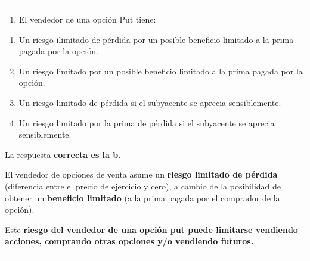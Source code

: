 \documentclass[
  letterpaper,
  DIV=11,
  numbers=noendperiod]{scrreprt}
\providecommand{\tightlist}{%
  \setlength{\itemsep}{0pt}\setlength{\parskip}{0pt}}\usepackage{longtable,booktabs,array}
\begin{document}
\begin{center}\rule{0.5\linewidth}{0.5pt}\end{center}

\begin{enumerate}
\def\labelenumi{\arabic{enumi}.}
\setcounter{enumi}{7}
\tightlist
\item
  El vendedor de una opción Put tiene:
\end{enumerate}

\begin{enumerate}
\def\labelenumi{\alph{enumi})}
\item
  Un riesgo ilimitado de pérdida por un posible beneficio limitado a la
  prima pagada por la opción.
\item
  Un riesgo limitado por un posible beneficio limitado a la prima pagada
  por la opción.
\item
  Un riesgo limitado de pérdida si el subyacente se aprecia
  sensiblemente.
\item
  Un riesgo limitado por la prima de pérdida si el subyacente se aprecia
  sensiblemente.
\end{enumerate}

\begin{tcolorbox}[enhanced jigsaw, left=2mm, opacityback=0, colback=white, breakable, arc=.35mm, bottomrule=.15mm, rightrule=.15mm, toprule=.15mm, leftrule=.75mm, colframe=quarto-callout-tip-color-frame]
\begin{minipage}[t]{5.5mm}
\textcolor{quarto-callout-tip-color}{\faLightbulb}
\end{minipage}%
\begin{minipage}[t]{\textwidth - 5.5mm}

La respuesta \textbf{correcta es la b}.

El vendedor de opciones de venta asume un \textbf{riesgo limitado de
pérdida} (diferencia entre el precio de ejercicio y cero), a cambio de
la posibilidad de obtener un \textbf{beneficio limitado} (a la prima
pagada por el comprador de la opción).

Este \textbf{riesgo del vendedor de una opción put puede limitarse
vendiendo acciones, comprando otras opciones y/o vendiendo futuros.}

\end{minipage}%
\end{tcolorbox}

\begin{center}\rule{0.5\linewidth}{0.5pt}\end{center}
\end{document}
